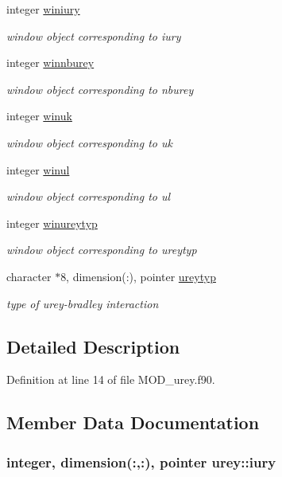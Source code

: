 \begin{DoxyCompactItemize}
integer \hyperlink{classurey_a06f6e3c501f1deefacf31961bcdf92ad}{winiury}
\begin{DoxyCompactList}\small\item\em window object corresponding to iury \end{DoxyCompactList}\item 
integer \hyperlink{classurey_a6e00dbd3a8fa551480df4387a3395bea}{winnburey}
\begin{DoxyCompactList}\small\item\em window object corresponding to nburey \end{DoxyCompactList}\item 
integer \hyperlink{classurey_afac1bdac5167e22bc6e0bc1fbbca90c0}{winuk}
\begin{DoxyCompactList}\small\item\em window object corresponding to uk \end{DoxyCompactList}\item 
integer \hyperlink{classurey_a3699f6c0c0f84cfdc816f511699961e3}{winul}
\begin{DoxyCompactList}\small\item\em window object corresponding to ul \end{DoxyCompactList}\item 
integer \hyperlink{classurey_aa2711b5e01d4e98e57eefd8b8d3e2104}{winureytyp}
\begin{DoxyCompactList}\small\item\em window object corresponding to ureytyp \end{DoxyCompactList}\item 
character $\ast$8, dimension(\-:), pointer \hyperlink{classurey_a2b42e1fe25c411e3bf60b0fbba5471c0}{ureytyp}
\begin{DoxyCompactList}\small\item\em type of urey-\/bradley interaction \end{DoxyCompactList}\end{DoxyCompactItemize}


\subsection{Detailed Description}


Definition at line 14 of file M\-O\-D\-\_\-urey.\-f90.



\subsection{Member Data Documentation}
\hypertarget{classurey_ac0be6030887dcc7b4b10c65e237e7bc9}{
\subsubsection[{iury}]{\setlength{\rightskip}{0pt plus 5cm}integer, dimension(\-:,\-:), pointer urey\-::iury}}\label{classurey_ac0be6030887dcc7b4b10c65e237e7bc9}


